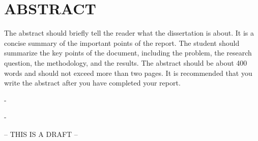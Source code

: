 \chapter*{\Large \uppercase{Abstract}}
\label{chap:Abstract}

The abstract should briefly tell the reader what the dissertation is about. It is a concise summary of the important points of the report.  The student should summarize the key points of the document, including the problem, the research question, the methodology, and the results.  The abstract should be about 400 words and should not exceed more than two pages.  It is recommended that you write the abstract after you have completed your report.

-

-

-- THIS IS A DRAFT --